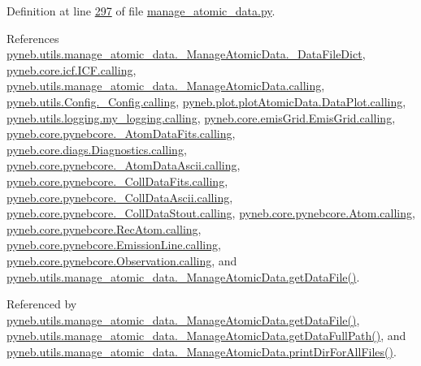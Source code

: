 Definition at line \hyperlink{manage__atomic__data_8py_source_l00297}{297} of file \hyperlink{manage__atomic__data_8py_source}{manage\-\_\-atomic\-\_\-data.\-py}.



References \hyperlink{manage__atomic__data_8py_source_l00078}{pyneb.\-utils.\-manage\-\_\-atomic\-\_\-data.\-\_\-\-Manage\-Atomic\-Data.\-\_\-\-Data\-File\-Dict}, \hyperlink{icf_8py_source_l00016}{pyneb.\-core.\-icf.\-I\-C\-F.\-calling}, \hyperlink{manage__atomic__data_8py_source_l00018}{pyneb.\-utils.\-manage\-\_\-atomic\-\_\-data.\-\_\-\-Manage\-Atomic\-Data.\-calling}, \hyperlink{_config_8py_source_l00032}{pyneb.\-utils.\-Config.\-\_\-\-Config.\-calling}, \hyperlink{plot_atomic_data_8py_source_l00042}{pyneb.\-plot.\-plot\-Atomic\-Data.\-Data\-Plot.\-calling}, \hyperlink{logging_8py_source_l00044}{pyneb.\-utils.\-logging.\-my\-\_\-logging.\-calling}, \hyperlink{emis_grid_8py_source_l00044}{pyneb.\-core.\-emis\-Grid.\-Emis\-Grid.\-calling}, \hyperlink{pynebcore_8py_source_l00097}{pyneb.\-core.\-pynebcore.\-\_\-\-Atom\-Data\-Fits.\-calling}, \hyperlink{diags_8py_source_l00169}{pyneb.\-core.\-diags.\-Diagnostics.\-calling}, \hyperlink{pynebcore_8py_source_l00318}{pyneb.\-core.\-pynebcore.\-\_\-\-Atom\-Data\-Ascii.\-calling}, \hyperlink{pynebcore_8py_source_l00585}{pyneb.\-core.\-pynebcore.\-\_\-\-Coll\-Data\-Fits.\-calling}, \hyperlink{pynebcore_8py_source_l00936}{pyneb.\-core.\-pynebcore.\-\_\-\-Coll\-Data\-Ascii.\-calling}, \hyperlink{pynebcore_8py_source_l01156}{pyneb.\-core.\-pynebcore.\-\_\-\-Coll\-Data\-Stout.\-calling}, \hyperlink{pynebcore_8py_source_l01229}{pyneb.\-core.\-pynebcore.\-Atom.\-calling}, \hyperlink{pynebcore_8py_source_l02643}{pyneb.\-core.\-pynebcore.\-Rec\-Atom.\-calling}, \hyperlink{pynebcore_8py_source_l03385}{pyneb.\-core.\-pynebcore.\-Emission\-Line.\-calling}, \hyperlink{pynebcore_8py_source_l03541}{pyneb.\-core.\-pynebcore.\-Observation.\-calling}, and \hyperlink{manage__atomic__data_8py_source_l00297}{pyneb.\-utils.\-manage\-\_\-atomic\-\_\-data.\-\_\-\-Manage\-Atomic\-Data.\-get\-Data\-File()}.



Referenced by \hyperlink{manage__atomic__data_8py_source_l00297}{pyneb.\-utils.\-manage\-\_\-atomic\-\_\-data.\-\_\-\-Manage\-Atomic\-Data.\-get\-Data\-File()}, \hyperlink{manage__atomic__data_8py_source_l00339}{pyneb.\-utils.\-manage\-\_\-atomic\-\_\-data.\-\_\-\-Manage\-Atomic\-Data.\-get\-Data\-Full\-Path()}, and \hyperlink{manage__atomic__data_8py_source_l00172}{pyneb.\-utils.\-manage\-\_\-atomic\-\_\-data.\-\_\-\-Manage\-Atomic\-Data.\-print\-Dir\-For\-All\-Files()}.


